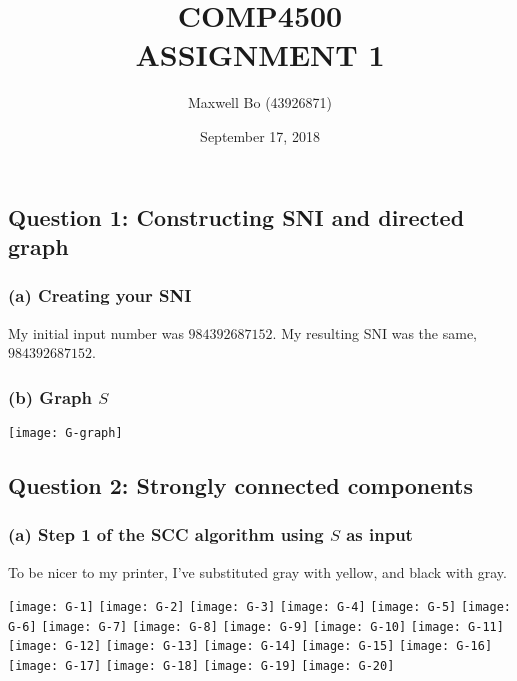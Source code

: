 \documentclass[11pt,a4paper]{article}
\begin{document}
\title{COMP4500 \\ ASSIGNMENT 1}
\author{Maxwell Bo (43926871)}
\date{September 17, 2018}
\maketitle

\subsection*{Question 1: Constructing SNI and directed graph}
\subsubsection*{(a) Creating your SNI}

My initial input number was $984392687152$. My resulting SNI was the same, $984392687152$.

\subsubsection*{(b) Graph $S$}

\texttt{[image: G-graph]}
\newpage
\subsection*{Question 2: Strongly connected components}

\subsubsection*{(a) Step 1 of the SCC algorithm using $S$ as input}

To be nicer to my printer, I've substituted gray with yellow, and black with gray.

\texttt{[image: G-1]}
\texttt{[image: G-2]}
\texttt{[image: G-3]}
\texttt{[image: G-4]}
\texttt{[image: G-5]}
\texttt{[image: G-6]}
\texttt{[image: G-7]}
\texttt{[image: G-8]}
\texttt{[image: G-9]}
\texttt{[image: G-10]}
\texttt{[image: G-11]}
\texttt{[image: G-12]}
\texttt{[image: G-13]}
\texttt{[image: G-14]}
\texttt{[image: G-15]}
\texttt{[image: G-16]}
\texttt{[image: G-17]}
\texttt{[image: G-18]}
\texttt{[image: G-19]}
\texttt{[image: G-20]}
\end{document}
